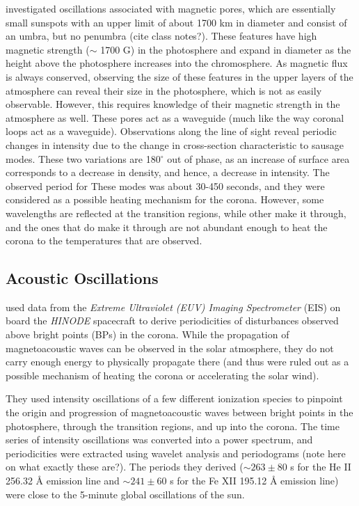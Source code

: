 \documentclass[preprint2]{aastex}
\begin{document}
\cite{sausage_2} investigated oscillations associated with magnetic
pores, which are essentially small sunspots with an upper limit of
about 1700 km in diameter and consist of an umbra, but no penumbra
(cite class notes?). These features have high magnetic strength
($\sim$ 1700 G) in the photosphere and expand in diameter as the
height above the
photosphere increases into the chromosphere. As magnetic flux is
always conserved, observing the size of these features in the upper
layers of the atmosphere can reveal their size in the photosphere,
which is not as easily observable. However, this requires knowledge
of their magnetic strength in the atmosphere as well.
These pores act as a waveguide (much like the way coronal loops act
as a waveguide). Observations along the line of sight reveal periodic
changes in intensity due to the change in cross-section characteristic
to sausage modes. These two variations are 180$^{\circ}$ out of phase,
as an increase of surface area corresponds to a decrease in density,
and hence, a decrease in intensity. The observed period for These modes
was about 30-450 seconds, and they were considered as a
possible heating mechanism for the corona. However, some wavelengths are
reflected at the transition regions, while other make it through,
and the ones that do make it through are not abundant enough to heat
the corona to the temperatures that are observed.
\subsection{Acoustic Oscillations}

\cite{acoustic_2} used data from the
\emph{Extreme Ultraviolet (EUV) Imaging Spectrometer} (EIS) on board the
\emph{HINODE} spacecraft to derive periodicities of disturbances
observed above bright points (BPs) in the corona.
While the propagation of magnetoacoustic waves can be observed
in the solar atmosphere, they do not carry enough energy to physically
propagate there (and thus were ruled out as a possible mechanism of
heating the corona or accelerating the solar wind).

They used intensity oscillations of a few different ionization
species to pinpoint the origin and progression of magnetoacoustic waves
between bright points in the photosphere, through the transition regions,
and up into the corona. The time series of intensity oscillations was
converted into a power spectrum, and periodicities were extracted using
wavelet analysis and periodograms (note here on what exactly these are?).
The periods they derived
($\sim 263 \pm 80$ s for the He II 256.32 \AA{} emission line and
$\sim 241 \pm 60$ s for the Fe XII 195.12 \AA{}  emission line)
were close to the 5-minute global oscillations of the sun.
\end{document}

